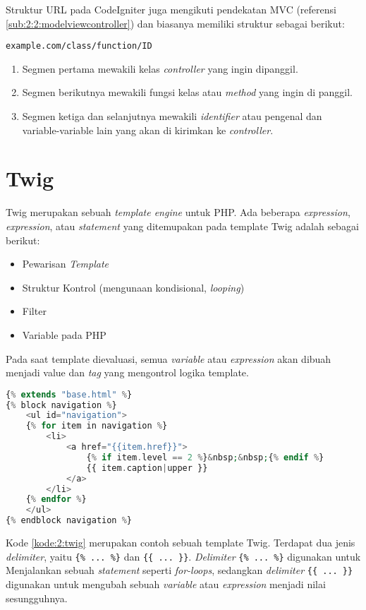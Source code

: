 Struktur URL pada CodeIgniter juga mengikuti pendekatan MVC (referensi \ref{sub:2:2:modelviewcontroller}) dan biasanya memiliki struktur sebagai berikut:

\begin{center}
	\verb|example.com/class/function/ID|
\end{center}

\begin{enumerate}
	\item Segmen pertama mewakili kelas \textit{controller} yang ingin dipanggil.
	\item Segmen berikutnya mewakili fungsi kelas atau \textit{method} yang ingin di panggil.
	\item Segmen ketiga dan selanjutnya mewakili \textit{identifier} atau pengenal dan variable-variable lain yang akan di kirimkan ke \textit{controller}.
\end{enumerate}

\section{Twig}
\label{sec:2:twig}

Twig merupakan sebuah \textit{template engine} untuk PHP. Ada beberapa \textit{expression}, \textit{expression}, atau \textit{statement} yang ditemupakan pada template Twig adalah sebagai berikut:
\begin{itemize}
	\item Pewarisan \textit{Template}
	\item Struktur Kontrol (mengunaan kondisional, \textit{looping})
	\item Filter
	\item Variable pada PHP
\end{itemize}

Pada saat template dievaluasi, semua \textit{variable} atau \textit{expression} akan dibuah menjadi value dan \textit{tag} yang mengontrol logika template.

\begin{lstlisting}[language={php}, caption={Contoh template Twig}, label={kode:2:twig}]
{% extends "base.html" %}
{% block navigation %}
	<ul id="navigation">
	{% for item in navigation %}
		<li>
			<a href="{{item.href}}">
				{% if item.level == 2 %}&nbsp;&nbsp;{% endif %}
				{{ item.caption|upper }}
			</a>
		</li>
	{% endfor %}
	</ul>
{% endblock navigation %}
\end{lstlisting}

Kode \ref{kode:2:twig} merupakan contoh sebuah template Twig. Terdapat dua jenis \textit{delimiter}, yaitu \verb|{% ... %}| dan \verb|{{ ... }}|. \textit{Delimiter} \verb|{% ... %}| digunakan untuk Menjalankan sebuah \textit{statement} seperti \textit{for-loops}, sedangkan \textit{delimiter} \verb|{{ ... }}| digunakan untuk mengubah sebuah \textit{variable} atau \textit{expression} menjadi nilai sesungguhnya.

